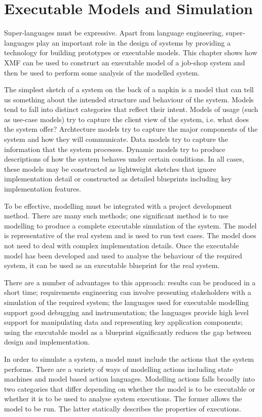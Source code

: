 
\chapter{Executable Models and Simulation}

Super-languages must be expressive. Apart from language engineering,
super-languages play an important role in the design of systems by
providing a technology for building prototypes or executable models.
This chapter shows how XMF can be used to construct an executable
model of a job-shop system and then be used to perform some analysis
of the modelled system.

The simplest sketch of a system on the back of a napkin is a model
that can tell us something about the intended structure and behaviour
of the system. Models tend to fall into distinct categories that reflect
their intent. Models of usage (such as use-case models) try to capture
the client view of the system, i.e. what does the system offer? Archtecture
models try to capture the major components of the system and how they
will communicate. Data models try to capture the information that
the system processes. Dynamic models try to produce descriptions of
how the system behaves under certain conditions. In all cases, these
models may be constructed as lightweight sketches that ignore implementation
detail or constructed as detailed blueprints including key implementation
features.

To be effective, modelling must be integrated with a project development
method. There are many such methods; one significant method is to
use modelling to produce a complete executable simulation of the system.
The model is representative of the real system and is used to run
test cases. The model does not need to deal with complex implementation
details. Once the executable model has been developed and used to
analyse the behaviour of the required system, it can be used as an
executable blueprint for the real system.

There are a number of advantages to this approach: results can be
produced in a short time; requirements engineering can involve presenting
stakeholders with a simulation of the required system; the languages
used for executable modelling support good debugging and instrumentation;
the languages provide high level support for manipulating data and
representing key application components; using the executable model
as a blueprint significantly reduces the gap between design and implementation.

In order to simulate a system, a model must include the actions that
the system performs. There are a variety of ways of modelling actions
including state machines and model based action languages. Modelling
actions falls broadly into two categories that differ depending on
whether the model is to be executable or whether it is to be used
to analyse system executions. The former allows the model to be run.
The latter statically describes the properties of executions.

